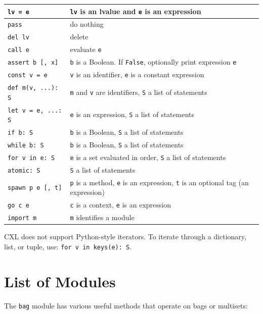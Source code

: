 \documentclass{report}
\begin{document}
\vspace{1em}
\begin{tabular}{|l|l|}
\hline
\texttt{lv = e} & \texttt{lv} is an lvalue and \texttt{e} is an expression\\
\hline
\texttt{pass} & do nothing\\
\hline
\texttt{del lv} & delete\\
\hline
\texttt{call e} & evaluate \texttt{e}\\
\hline
\texttt{assert b [, x]} & \texttt{b} is a Boolean.  If \texttt{False}, optionally print expression \texttt{e}\\
\hline
\texttt{const v = e} & \texttt{v} is an identifier, \texttt{e} is a constant expression\\
\hline
\texttt{def m(v, ...): S} & \texttt{m} and \texttt{v} are identifiers, \texttt{S} a list of statements\\
\hline
\texttt{let v = e, ...: S} & \texttt{e} is an expression, \texttt{S} a list of statements\\
\hline
\texttt{if b: S} & \texttt{b} is a Boolean, \texttt{S} a list of statements\\
\hline
\texttt{while b: S} & \texttt{b} is a Boolean, \texttt{S} a list of statements\\
\hline
\texttt{for v in e: S} & \texttt{e} is a set evaluated in order,
                            \texttt{S} a list of statements\\
\hline
\texttt{atomic: S} & \texttt{S} a list of statements\\
\hline
\texttt{spawn p e [, t]} & \texttt{p} is a method, \texttt{e} is an expression, \texttt{t} is an optional tag (an expression) \\
\hline
\texttt{go c e} & \texttt{c} is a context, \texttt{e} is an expression \\
\hline
\texttt{import m} & \texttt{m} identifies a module \\
\hline
\end{tabular}
\vspace{1em}

CXL does not support Python-style iterators.
To iterate through a dictionary, list, or tuple, use:
\texttt{for v in keys(e):~S}.

\chapter{List of Modules}

The \texttt{bag} module has various useful methods that operate on bags or
multisets:
\end{document}
